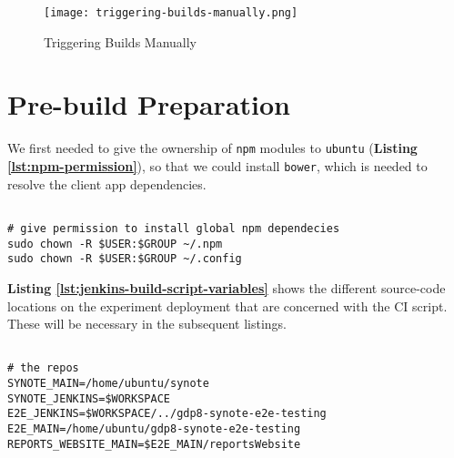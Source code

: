 \vspace{0.5cm}

\begin{figure}[!hbt]
  	\centering
 	\texttt{[image: triggering-builds-manually.png]}
  	\caption{Triggering Builds Manually}
 	\label{fig:triggering-builds-manually}
\end{figure}

\vspace{-0.5cm}

\section{Pre-build Preparation}
\label{sec:pre-build-preparation}

We first needed to give the ownership of \texttt{npm} modules to \texttt{ubuntu} (\textbf{Listing \ref{lst:npm-permission}}), so that we could install \texttt{bower}, which is needed to resolve the client app dependencies.\\

\begin{listing}[H]
\begin{verbatim}

# give permission to install global npm dependecies
sudo chown -R $USER:$GROUP ~/.npm
sudo chown -R $USER:$GROUP ~/.config

\end{verbatim}
\label{lst:npm-permission}
\end{listing}

\textbf{Listing \ref{lst:jenkins-build-script-variables}} shows the different source-code locations on the experiment deployment that are concerned with the CI script. These will be necessary in the subsequent listings.\\

\begin{listing}[H]
\begin{verbatim}

# the repos
SYNOTE_MAIN=/home/ubuntu/synote
SYNOTE_JENKINS=$WORKSPACE
E2E_JENKINS=$WORKSPACE/../gdp8-synote-e2e-testing
E2E_MAIN=/home/ubuntu/gdp8-synote-e2e-testing
REPORTS_WEBSITE_MAIN=$E2E_MAIN/reportsWebsite

\end{verbatim}
\label{lst:jenkins-build-script-variables}
\end{listing}

